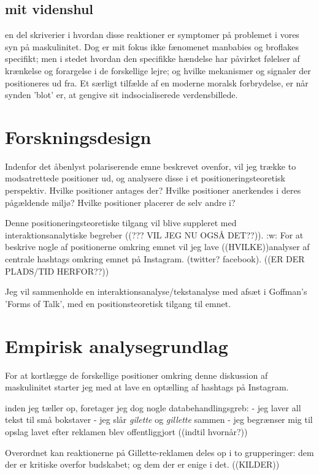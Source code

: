 \subsection{mit videnshul}

en del skriverier i hvordan disse reaktioner er symptomer på
problemet i vores syn på maskulinitet. Dog er mit fokus ikke
fænomenet manbabies og broflakes specifikt; men i stedet hvordan
den specifikke hændelse har påvirket følelser af krænkelse og
forargelse i de forskellige lejre; og hvilke mekanismer og
signaler der positioneres ud fra. Et særligt tilfælde af en
moderne moralsk forbrydelse, er når synden 'blot' er, at gengive
sit indsocialiserede verdensbillede.

\section{Forskningsdesign} 

Indenfor det åbenlyst polariserende emne beskrevet ovenfor, vil
jeg trække to modsatrettede positioner ud, og analysere disse i et
positioneringsteoretisk perspektiv. Hvilke positioner antages
der? Hvilke positioner anerkendes i deres pågældende miljø? Hvilke
positioner placerer de selv andre i?

Denne positioneringsteoretiske tilgang vil blive suppleret med
interaktionsanalytiske begreber ((??? VIL JEG NU OGSÅ DET??)).
:w: For at beskrive nogle af positionerne omkring emnet vil jeg
lave ((HVILKE))analyser af centrale hashtags omkring emnet på
Instagram.   (twitter?  facebook). ((ER DER PLADS/TID HERFOR??))


Jeg vil sammenholde en interaktionsanalyse/tekstanalyse med afsæt
i Goffman's 'Forms of Talk', med en positionsteoretisk tilgang til
emnet. 


\section{Empirisk analysegrundlag}

For at kortlægge de forskellige positioner omkring denne 
diskussion af maskulinitet starter jeg med at lave en optælling af 
hashtags på Instagram.

inden jeg tæller op, foretager jeg dog nogle databehandlingsgreb:
- jeg laver all tekst til små bokstaver
- jeg slår \emph{gilette} og \emph{gillette} sammen
- jeg begrænser mig til opslag lavet efter reklamen blev
offentliggjort ((indtil hvornår?))


Overordnet kan reaktionerne på Gillette-reklamen deles op i to
grupperinger: dem der er kritiske overfor budskabet; og dem der er
enige i det. ((KILDER))

